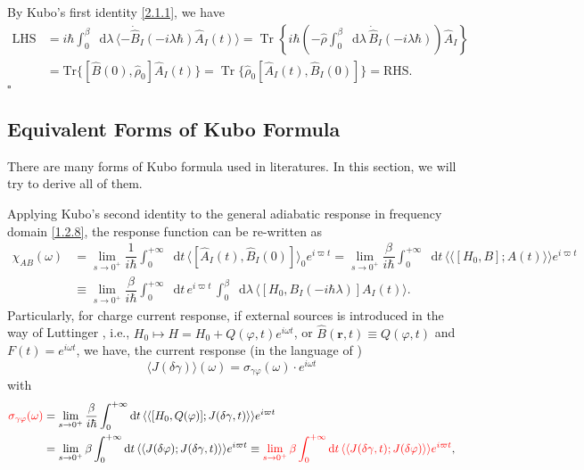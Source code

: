 \documentclass[10pt,nofootinbib,letterpaper]{revtex4}
\newcommand*\dd{\mathop{}\!\mathrm{d}}
\newenvironment{Proof}{{\par~{\normalfont\bfseries $\vartriangleright$}~~}}{\hfill $\square$\par\hfill\par} %
\begin{document}
		\begin{Proof}
			By Kubo's first identity \eqref{2.1.1}, we have
			\begin{align*}
				\text{LHS}&=i\hbar\int_0^\beta\dd\lambda\,\langle-\dot{\hat B}_I(-i\lambda\hbar)\hat A_I(t)\rangle=\mathop{\mathrm{Tr}}\left\{i\hbar\left(-\hat\rho\int_0^\beta\dd\lambda\,\dot{\hat B}_I(-i\lambda\hbar)\right)\hat A_I\right\}\\
				&=\mathrm{Tr}\{[\hat B(0),\hat\rho_0]\hat A_I(t)\}=\mathop{\mathrm{Tr}}\{\hat\rho_0[\hat A_I(t),\hat B_I(0)]\}=\text{RHS}.
			\end{align*}
		\end{Proof}

	\subsection{Equivalent Forms of Kubo Formula}
		There are many forms of Kubo formula used in literatures. In this section, we will try to derive all of them.\par
		Applying Kubo's second identity to the general adiabatic response in frequency domain \eqref{1.2.8}, the response function can be re-written as
		\begin{align}
			\chi_{AB}(\omega)&=\lim_{s \rightarrow0^+}\dfrac{1}{i\hbar}\int_0^{+\infty}\dd t\,\langle[\hat A_I(t),\hat B_I(0)]\rangle_0 e^{i\varpi t}=\lim_{s \rightarrow0^+}\dfrac{\beta}{i\hbar}\int_0^{+\infty}\dd t\,\langle\langle[H_0, B]; A(t)\rangle\rangle e^{i\varpi t}\nonumber\\
			&\equiv\lim_{s \rightarrow0^+}\dfrac{\beta}{i\hbar}\int_0^{+\infty}\dd t\, e^{i\varpi t}\,\int_0^\beta\dd\lambda\,\langle[H_0,B_I(-i\hbar\lambda)]A_I(t)\rangle.\label{2.1.2}
		\end{align}
		\indent Particularly, for charge current response, if external sources is introduced in the way of Luttinger \cite{luttinger1964theory}, i.e., $H_0\mapsto H=H_0+Q(\varphi,t)e^{i\omega t}$, or $\hat B(\bm{r},t)\equiv Q(\varphi,t)$ and $F(t)=e^{i\omega t}$, we have, the current response (in the language of \cite{kapustin2020thermal})
		\begin{equation*}
			\langle J(\delta\gamma)\rangle(\omega)=\sigma_{\gamma\varphi}(\omega)\cdot e^{i\omega t}
		\end{equation*}
		with
		\begin{align}
			{\color{red}\sigma_{\gamma\varphi}(\omega)}&=\lim_{s \rightarrow0^+}\dfrac{\beta}{i\hbar}\int_0^{+\infty}\dd t\,\langle\langle[H_0, Q(\varphi)]; J(\delta\gamma,t)\rangle\rangle e^{i\varpi t}\nonumber\\
			&=\lim_{s \rightarrow0^+}\beta\int_0^{+\infty}\dd t\,\langle\langle J(\delta\varphi); J(\delta\gamma,t)\rangle\rangle e^{i\varpi t}\equiv{\color{red}\lim_{s \rightarrow0^+}\beta\int_0^{+\infty}\dd t\,\langle\langle J(\delta\gamma,t); J(\delta\varphi)\rangle\rangle e^{i\varpi t}},\label{2.1.3}
		\end{align}
\end{document}
